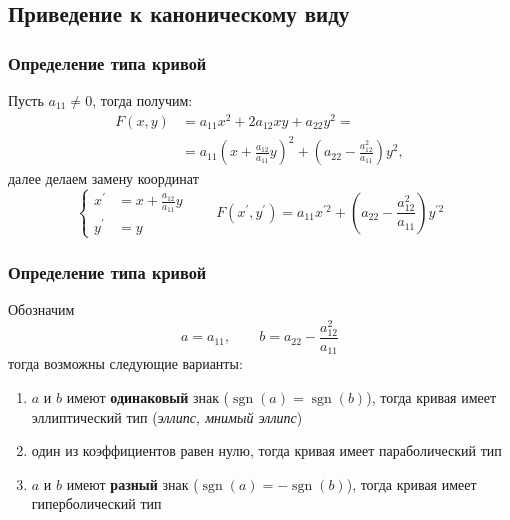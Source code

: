 \documentclass[10pt]{beamer}
\begin{document}
    \subsection{Приведение к каноническому виду}
    \begin{frame}
        \frametitle{Определение типа кривой}
        Пусть $a_{11} \neq 0$, тогда получим:
        \begin{equation}
            \begin{aligned}
                F(x,y) & = a_{11}x^2 + 2a_{12}xy+a_{22}y^2 = \\
                & = a_{11}\left(x + \frac{a_{12}}{a_{11}}y \right)^2 + \left(a_{22} - \frac{a_{12}^2}{a_{11}} \right)y^2,
            \end{aligned}
        \end{equation} 
        далее делаем замену координат
        \begin{equation}
            \left\{
                \begin{aligned}
                    x^\prime & = x + \frac{a_{12}}{a_{11}}y \\
                    y^\prime & = y
                \end{aligned}
            \right.
            \qquad
            F(x^\prime, y^\prime) = a_{11}x^{\prime 2} + \left(a_{22} - \frac{a_{12}^2}{a_{11}} \right)y^{\prime 2}
        \end{equation}
    \end{frame}

    \begin{frame}
        \frametitle{Определение типа кривой}
        Обозначим
        \begin{equation}
            a = a_{11}, \qquad b = a_{22} - \frac{a_{12}^2}{a_{11}}
        \end{equation}
        тогда возможны следующие варианты:
        \begin{enumerate}
            \item $a$ и $b$ имеют \textbf{одинаковый} знак ($\operatorname{sgn}(a) = \operatorname{sgn}(b)$), 
            тогда кривая имеет эллиптический тип (\textit{эллипс, мнимый эллипс})
            \item один из коэффициентов равен нулю, тогда кривая имеет параболический тип
            \item $a$ и $b$ имеют \textbf{разный} знак ($\operatorname{sgn}(a) = - \operatorname{sgn}(b)$), тогда кривая имеет гиперболический тип
        \end{enumerate}
    \end{frame}
\end{document}
